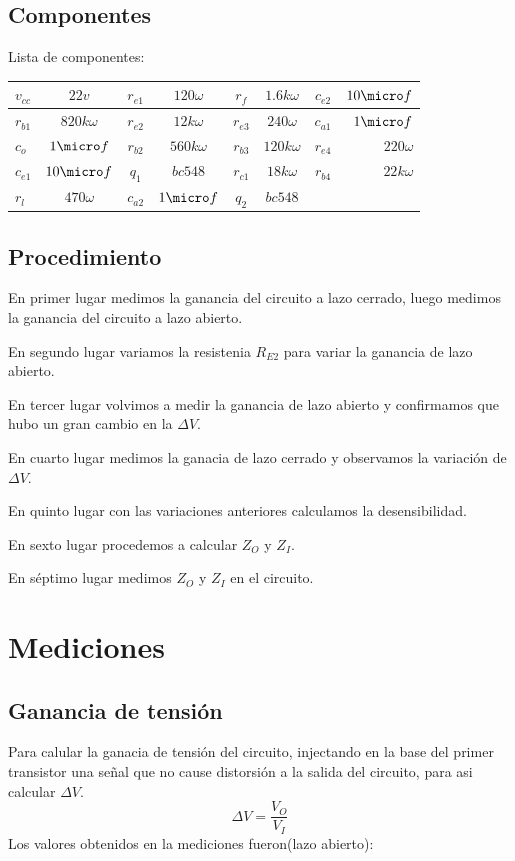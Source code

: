 \documentclass[12pt]{article}
\begin{document}
\subsection{Componentes}
Lista de componentes:

\begin{tabular}{| l | c || c | c || c | c || c | r | }
 \hline                 
$v_{cc}$ & $22v$ & $r_{e1}$ & $120 \omega$ & $r_f$ & $1.6 k \omega$ & $ c_{e2} $ & $ 10\micro f $ \\
 \hline                 
$r_{b1}$ & $820k\omega$ & $r_{e2}$ & $12k \omega$ & $r_{e3}$ & $240 \omega$ & $ c_{a1} $ & $ 1\micro f $ \\
 \hline                 
$c_{o}$ & $1\micro f$ & $r_{b2}$ & $560k \omega$ & $r_{b3}$ & $120 k \omega$ & $ r_{e4} $ & $ 220\omega $ \\
 \hline                 
$c_{e1}$ & $10\micro f$ & $q_{1}$ & $bc548$ & $r_{c1}$ & $18 k \omega$ & $ r_{b4} $ & $ 22k \omega $ \\
 \hline                
$r_{l}$ & $470\omega$ & $c_{a2}$ & $1\micro f$ & $q_{2}$ & $bc548$ &  &  \\
 \hline  
 \end{tabular}
 
\subsection{Procedimiento}
En primer lugar medimos la ganancia del circuito a lazo cerrado, luego medimos la ganancia del circuito a lazo abierto.

En segundo lugar variamos la resistenia $R_{E2}$ para variar la ganancia de lazo abierto.

En tercer lugar volvimos a medir la ganancia de lazo abierto y confirmamos que hubo un gran cambio en la $\Delta V$.

En cuarto lugar medimos la ganacia de lazo cerrado y observamos la variación de  $\Delta V$.

En quinto lugar con las variaciones anteriores calculamos la desensibilidad.

En sexto lugar procedemos a calcular $Z_O$ y $Z_I$.

En séptimo lugar medimos $Z_O$ y $Z_I$ en el circuito.
\section{Mediciones}
\subsection{Ganancia de tensión }
Para calular la ganacia de tensión del circuito, injectando en la base del primer transistor una señal que no cause
distorsión a la salida del circuito, para asi calcular $\Delta V$.
\begin{equation}
\label{eq:gananciaTension}
\Delta V = \frac{V_O}{V_I} 
\end{equation}
Los valores obtenidos en la mediciones fueron(lazo abierto):
\end{document}
